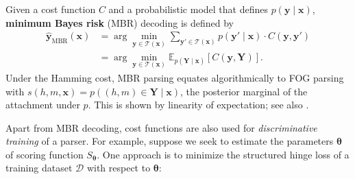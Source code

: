 \documentclass[11pt,letterpaper]{article}
\newcommand{\ignore}[1]{}
\newcommand{\adhicomment}[1]{\ignore{\textcolor{green}{{\textbf{[#1 --\textsc{adhi}]}}}}}
\begin{document}
Given a cost function $C$ and a probabilistic model that defines $p(\boldsymbol{y} \mid \boldsymbol{x})$, \textbf{minimum Bayes risk} (MBR) decoding is defined by
\begin{align}
\boldsymbol{\hat{y}}_{\text{MBR}}(\boldsymbol{x}) & = \arg\min_{\boldsymbol{y} \in \mathcal{T}(\boldsymbol{x})} \sum_{\boldsymbol{y'} \in \mathcal{T}(\boldsymbol{x})} p(\boldsymbol{y'} \mid \boldsymbol{x}) \cdot C(\boldsymbol{y}, \boldsymbol{y'}) \nonumber \\
& =
\arg \min_{\boldsymbol{y} \in \mathcal{T}(\boldsymbol{x})}  \mathbb{E}_{p(\boldsymbol{Y} \mid \boldsymbol{x})}[C(\boldsymbol{y}, \boldsymbol{Y})].
\label{eq:mbr}
\end{align}
Under the Hamming cost, MBR parsing equates algorithmically to FOG parsing with $s(h, m, \boldsymbol{x}) = p((h, m) \in \boldsymbol{Y} \mid \boldsymbol{x})$, the posterior marginal of the attachment under $p$.  This is shown by linearity of expectation; see also .

Apart from MBR decoding, cost functions are also used for \emph{discriminative training} \ignore{\adhicomment{can we say that this is a non-probabilistic use of cost?} use of cost functions is in \textbf{discriminative training} \adhicomment{R2 says that this part is confusing and that we should elaborate more what we mean by 'a rather different use of cost function'}}of a parser.  For example, suppose we seek to estimate the parameters $\boldsymbol\theta$ of scoring function $S_{\boldsymbol{\theta}}$.  One approach is to minimize the structured hinge loss of a training dataset $\mathcal{D}$ with respect to $\boldsymbol{\theta}$:
\end{document}
